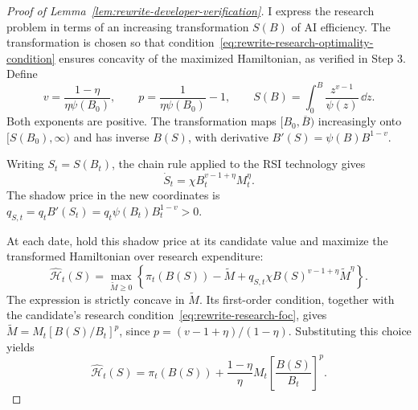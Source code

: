 \begin{proof}[Proof of Lemma~\ref{lem:rewrite-developer-verification}]
I express the research problem in terms of an increasing transformation
$S(B)$ of AI efficiency. The transformation is chosen so that
condition~\eqref{eq:rewrite-research-optimality-condition} ensures
concavity of the maximized Hamiltonian, as verified in Step 3. Define
\begin{equation}
 v=\frac{1-\eta}{\eta\psi(B_0)},\qquad
 p=\frac1{\eta\psi(B_0)}-1,\qquad
 S(B)=\int_0^B\frac{z^{v-1}}{\psi(z)}\,\dd z.
 \label{eq:rewrite-optimality-state}
\end{equation}
Both exponents are positive. The transformation maps
$[B_0,\overline B)$ increasingly onto $[S(B_0),\infty)$ and has
inverse $B(S)$, with derivative $B'(S)=\psi(B)B^{1-v}$.

Writing $S_t=S(B_t)$, the chain rule applied to the RSI technology gives
\[
 \dot S_t=\chi B_t^{v-1+\eta}M_t^\eta.
\]
The shadow price in the new coordinates is
$q_{S,t}=q_tB'(S_t)=q_t\psi(B_t)B_t^{1-v}>0$.

At each date, hold this shadow price at its candidate value and maximize
the transformed Hamiltonian over research expenditure:
\[
 \widehat{\mathcal H}_t(S)=
 \max_{\widetilde M\geq0}
 \left\{\pi_t(B(S))-\widetilde M+
 q_{S,t}\chi B(S)^{v-1+\eta}\widetilde M^\eta\right\}.
\]
The expression is strictly concave in $\widetilde M$. Its first-order
condition, together with the candidate's research
condition~\eqref{eq:rewrite-research-foc}, gives
$\widetilde M=M_t[B(S)/B_t]^p$, since
$p=(v-1+\eta)/(1-\eta)$. Substituting this choice yields
\begin{equation}
 \widehat{\mathcal H}_t(S)
 =\pi_t(B(S))+\frac{1-\eta}{\eta}M_t
 \left[\frac{B(S)}{B_t}\right]^p.
 \label{eq:rewrite-optimality-hamiltonian}
\end{equation}


\end{proof}
